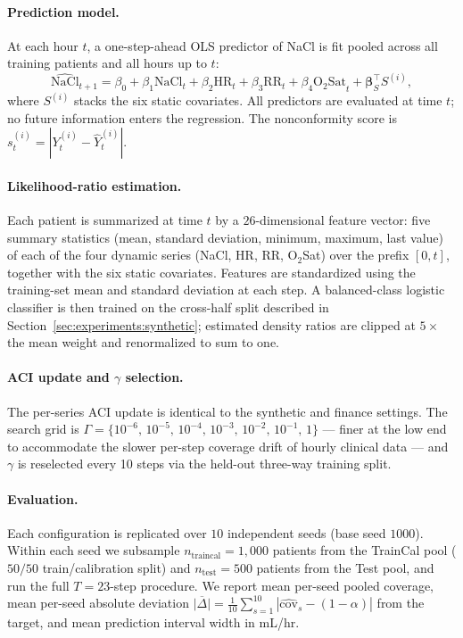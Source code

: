 \documentclass{article}
\numberwithin{equation}{section}
\begin{document}
\paragraph{Prediction model.}
At each hour $t$, a one-step-ahead OLS predictor of NaCl is fit pooled across
all training patients and all hours up to $t$:
\[
  \widehat{\mathrm{NaCl}}_{t+1}
  = \beta_0 + \beta_1 \mathrm{NaCl}_t + \beta_2 \mathrm{HR}_t
  + \beta_3 \mathrm{RR}_t + \beta_4 \mathrm{O_2Sat}_t
  + \boldsymbol{\beta}_S^{\!\top} S^{(i)},
\]
where $S^{(i)}$ stacks the six static covariates.  All predictors are
evaluated at time $t$; no future information enters the regression.  The
nonconformity score is $s_t^{(i)} = |Y_t^{(i)} - \hat Y_t^{(i)}|$.

\paragraph{Likelihood-ratio estimation.}
Each patient is summarized at time $t$ by a $26$-dimensional feature vector:
five summary statistics (mean, standard deviation, minimum, maximum, last
value) of each of the four dynamic series (NaCl, HR, RR, O$_2$Sat) over the
prefix $[0,t]$, together with the six static covariates.  Features are
standardized using the training-set mean and standard deviation at each step.
A balanced-class logistic classifier is then trained on the cross-half split
described in Section~\ref{sec:experiments:synthetic}; estimated density
ratios are clipped at $5\times$ the mean weight and renormalized to sum to
one.

\paragraph{ACI update and $\gamma$ selection.}
The per-series ACI update is identical to the synthetic and finance settings.
The search grid is $\Gamma = \{10^{-6},\, 10^{-5},\, 10^{-4},\, 10^{-3},\,
10^{-2},\, 10^{-1},\, 1\}$ --- finer at the low end to accommodate the
slower per-step coverage drift of hourly clinical data --- and $\gamma$ is
reselected every 10 steps via the held-out three-way training split.

\paragraph{Evaluation.}
Each configuration is replicated over $10$ independent seeds (base seed
$1000$).  Within each seed we subsample $n_{\mathrm{traincal}} = 1{,}000$
patients from the TrainCal pool ($50/50$ train/calibration split) and
$n_{\mathrm{test}} = 500$ patients from the Test pool, and run the full
$T = 23$-step procedure.  We report mean per-seed pooled coverage, mean
per-seed absolute deviation $\overline{|\Delta|} = \tfrac{1}{10}
\sum_{s=1}^{10} |\hat{\mathrm{cov}}_s - (1-\alpha)|$ from the target, and mean
prediction interval width in mL/hr.
\end{document}
